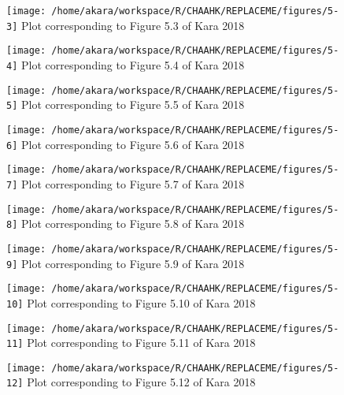 \documentclass{article}
\begin{document}
\begin{figure}[H]
	\texttt{[image: /home/akara/workspace/R/CHAAHK/REPLACEME/figures/5-3]}
	Plot corresponding to Figure 5.3 of Kara 2018
	\label{fig:5-3}
\end{figure}
\begin{figure}[H]
	\texttt{[image: /home/akara/workspace/R/CHAAHK/REPLACEME/figures/5-4]}
	Plot corresponding to Figure 5.4 of Kara 2018
	\label{fig:5-4}
\end{figure}
\begin{figure}[H]
	\texttt{[image: /home/akara/workspace/R/CHAAHK/REPLACEME/figures/5-5]}
	Plot corresponding to Figure 5.5 of Kara 2018
	\label{fig:5-5}
\end{figure}
\begin{figure}[H]
	\texttt{[image: /home/akara/workspace/R/CHAAHK/REPLACEME/figures/5-6]}
	Plot corresponding to Figure 5.6 of Kara 2018
	\label{fig:5-6}
\end{figure}
\begin{figure}[H]
	\texttt{[image: /home/akara/workspace/R/CHAAHK/REPLACEME/figures/5-7]}
	Plot corresponding to Figure 5.7 of Kara 2018
	\label{fig:5-7}
\end{figure}
\begin{figure}[H]
	\texttt{[image: /home/akara/workspace/R/CHAAHK/REPLACEME/figures/5-8]}
	Plot corresponding to Figure 5.8 of Kara 2018
	\label{fig:5-8}
\end{figure}
\begin{figure}[H]
	\texttt{[image: /home/akara/workspace/R/CHAAHK/REPLACEME/figures/5-9]}
	Plot corresponding to Figure 5.9 of Kara 2018
	\label{fig:5-9}
\end{figure}
\begin{figure}[H]
	\texttt{[image: /home/akara/workspace/R/CHAAHK/REPLACEME/figures/5-10]}
	Plot corresponding to Figure 5.10 of Kara 2018
	\label{fig:5-10}
\end{figure}
\begin{figure}[H]
	\texttt{[image: /home/akara/workspace/R/CHAAHK/REPLACEME/figures/5-11]}
	Plot corresponding to Figure 5.11 of Kara 2018
	\label{fig:5-11}
\end{figure}
\begin{figure}[H]
	\texttt{[image: /home/akara/workspace/R/CHAAHK/REPLACEME/figures/5-12]}
	Plot corresponding to Figure 5.12 of Kara 2018
	\label{fig:5-12}
\end{figure}
\end{document}
